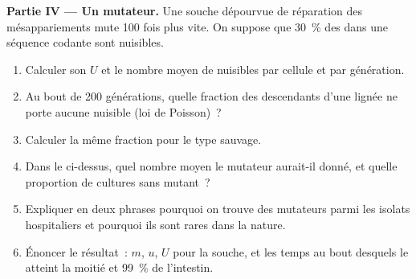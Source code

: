 \begin{problem}
\medskip
\noindent\textbf{Partie IV --- Un mutateur.}
Une souche dépourvue de réparation des mésappariements mute \num{100}
fois plus vite. On suppose que \qty{30}{\%} des  dans une
séquence codante sont nuisibles.
\begin{enumerate}[resume]
  \item Calculer son $U$ et le nombre moyen de  nuisibles par
        cellule et par génération.
  \item Au bout de \num{200} générations, quelle fraction des
        descendants d'une lignée ne porte aucune  nuisible
        (loi de Poisson)~?
  \item Calculer la même fraction pour le type sauvage.
  \item Dans le  ci-dessus, quel nombre moyen le
        mutateur aurait-il donné, et quelle proportion de cultures sans
        mutant~?
  \item Expliquer en deux phrases pourquoi on trouve des mutateurs parmi
        les isolats hospitaliers et pourquoi ils sont rares dans la
        nature.
  \item Énoncer le résultat~: $m$, $u$, $U$ pour la souche, et les temps
        au bout desquels le  atteint la moitié et \qty{99}{\%}
        de l'intestin.
\end{enumerate}
\end{problem}
